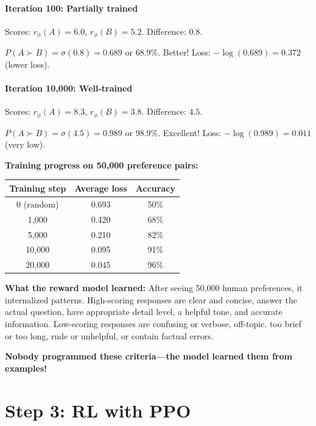 \begin{chapterenv}
\paragraph{Iteration 100: Partially trained}

Scores: $r_\phi(A) = 6.0$, $r_\phi(B) = 5.2$. Difference: $0.8$.

$P(A \succ B) = \sigma(0.8) = 0.689$ or 68.9\%. Better! Loss: $-\log(0.689) = 0.372$ (lower loss).

\paragraph{Iteration 10,000: Well-trained}

Scores: $r_\phi(A) = 8.3$, $r_\phi(B) = 3.8$. Difference: $4.5$.

$P(A \succ B) = \sigma(4.5) = 0.989$ or 98.9\%. Excellent! Loss: $-\log(0.989) = 0.011$ (very low).

\textbf{Training progress on 50,000 preference pairs:}

\begin{center}
\begin{tabular}{ccc}
\toprule
\textbf{Training step} & \textbf{Average loss} & \textbf{Accuracy} \\
\midrule
0 (random) & 0.693 & 50\% \\
1,000 & 0.420 & 68\% \\
5,000 & 0.210 & 82\% \\
10,000 & 0.095 & 91\% \\
20,000 & 0.045 & 96\% \\
\bottomrule
\end{tabular}
\end{center}

\begin{infobox}
\textbf{What the reward model learned:} After seeing 50,000 human preferences, it internalized patterns. High-scoring responses are clear and concise, answer the actual question, have appropriate detail level, a helpful tone, and accurate information. Low-scoring responses are confusing or verbose, off-topic, too brief or too long, rude or unhelpful, or contain factual errors.

\textbf{Nobody programmed these criteria---the model learned them from examples!}
\end{infobox}

\section{Step 3: RL with PPO}


\end{chapterenv}
